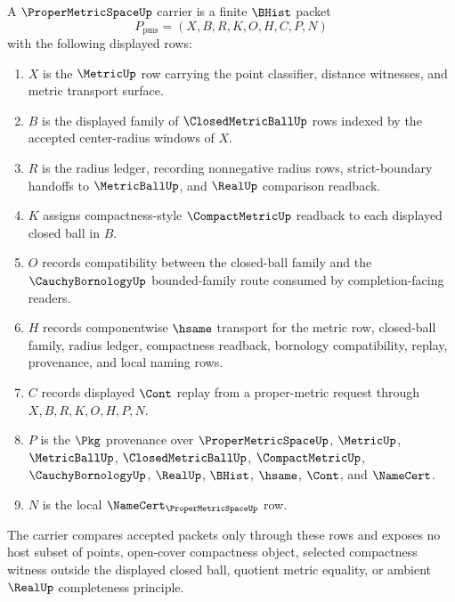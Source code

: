 \begin{definition}
\label{def:proper-metric-space-carrier}
A $\ProperMetricSpaceUp$ carrier is a finite $\BHist$ packet
$$
P_{\mathrm{pms}}=(X,B,R,K,O,H,C,P,N)
$$
with the following displayed rows:
\begin{enumerate}
\item $X$ is the $\MetricUp$ row carrying the point classifier, distance witnesses, and metric transport surface.
\item $B$ is the displayed family of $\ClosedMetricBallUp$ rows indexed by the accepted center-radius windows of $X$.
\item $R$ is the radius ledger, recording nonnegative radius rows, strict-boundary handoffs to $\MetricBallUp$, and $\RealUp$ comparison readback.
\item $K$ assigns compactness-style $\CompactMetricUp$ readback to each displayed closed ball in $B$.
\item $O$ records compatibility between the closed-ball family and the $\CauchyBornologyUp$ bounded-family route consumed by completion-facing readers.
\item $H$ records componentwise $\hsame$ transport for the metric row, closed-ball family, radius ledger, compactness readback, bornology compatibility, replay, provenance, and local naming rows.
\item $C$ records displayed $\Cont$ replay from a proper-metric request through $X,B,R,K,O,H,P,N$.
\item $P$ is the $\Pkg$ provenance over $\ProperMetricSpaceUp$, $\MetricUp$, $\MetricBallUp$, $\ClosedMetricBallUp$, $\CompactMetricUp$, $\CauchyBornologyUp$, $\RealUp$, $\BHist$, $\hsame$, $\Cont$, and $\NameCert$.
\item $N$ is the local $\NameCert_{\ProperMetricSpaceUp}$ row.
\end{enumerate}
The carrier compares accepted packets only through these rows and exposes no host subset of points, open-cover compactness object, selected compactness witness outside the displayed closed ball, quotient metric equality, or ambient $\RealUp$ completeness principle.
\end{definition}


